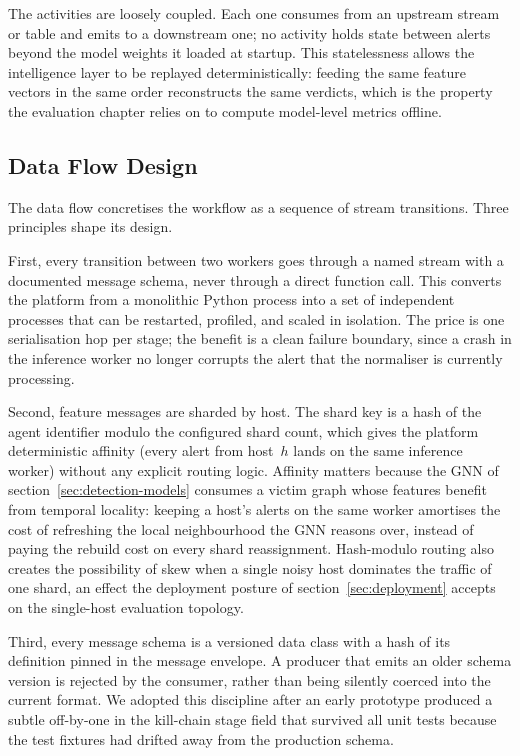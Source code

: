 The activities are loosely coupled. Each one consumes from an
upstream stream or table and emits to a downstream one; no activity
holds state between alerts beyond the model weights it loaded at
startup. This statelessness allows the intelligence layer to be
replayed deterministically: feeding the same feature vectors
in the same order reconstructs the same verdicts, which is the
property the evaluation chapter relies on to compute model-level
metrics offline.

\subsection{Data Flow Design}
\label{sec:dataflow}

The data flow concretises the workflow as a sequence of stream
transitions. Three principles shape its design.

First, every transition between two workers goes through a named
stream with a documented message schema, never through a direct
function call. This converts the platform from a monolithic Python
process into a set of independent processes that can be restarted,
profiled, and scaled in isolation. The price is one serialisation
hop per stage; the benefit is a clean failure boundary, since a
crash in the inference worker no longer corrupts the alert that the
normaliser is currently processing.

Second, feature messages are sharded by host. The shard key is a
hash of the agent identifier modulo the configured shard count, which
gives the platform deterministic affinity (every alert from
host~$h$ lands on the same inference worker) without any explicit
routing logic. Affinity matters because the GNN of
section~\ref{sec:detection-models} consumes a victim graph whose
features benefit from temporal locality: keeping a host's alerts on
the same worker amortises the cost of refreshing the local
neighbourhood the GNN reasons over, instead of paying the rebuild
cost on every shard reassignment. Hash-modulo routing also creates
the possibility of skew when a single noisy host dominates the
traffic of one shard, an effect the deployment posture of
section~\ref{sec:deployment} accepts on the single-host evaluation
topology.

Third, every message schema is a versioned data class with a hash
of its definition pinned in the message envelope. A producer that
emits an older schema version is rejected by the consumer, rather
than being silently coerced into the current format. We adopted this
discipline after an early prototype produced a subtle off-by-one in
the kill-chain stage field that survived all unit tests because the
test fixtures had drifted away from the production schema.


